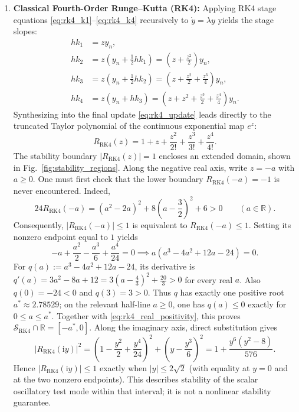 \documentclass[11pt,a4paper]{article}
\theoremstyle{definition}
\theoremstyle{remark}
\begin{document}
\begin{enumerate}
    \item \textbf{Classical Fourth-Order Runge--Kutta (RK4):} Applying RK4 stage equations \eqref{eq:rk4_k1}--\eqref{eq:rk4_k4} recursively to $\dot{y} = \lambda y$ yields the stage slopes:
    \begin{align}
    h k_1 &= z y_n, \label{eq:rk4_stg1} \\
    h k_2 &= z \left( y_n + \frac{1}{2} h k_1 \right) = \left( z + \frac{z^2}{2} \right) y_n, \label{eq:rk4_stg2} \\
    h k_3 &= z \left( y_n + \frac{1}{2} h k_2 \right) = \left( z + \frac{z^2}{2} + \frac{z^3}{4} \right) y_n, \label{eq:rk4_stg3} \\
    h k_4 &= z \left( y_n + h k_3 \right) = \left( z + z^2 + \frac{z^3}{2} + \frac{z^4}{4} \right) y_n. \label{eq:rk4_stg4}
    \end{align}
    Synthesizing into the final update \eqref{eq:rk4_update} leads directly to the truncated Taylor polynomial of the continuous exponential map $e^z$:
    \begin{equation}
    \label{eq:R_RK4}
    R_{\mathrm{RK4}}(z) = 1 + z + \frac{z^2}{2!} + \frac{z^3}{3!} + \frac{z^4}{4!}.
    \end{equation}
    The stability boundary $|R_{\mathrm{RK4}}(z)| = 1$ encloses an extended domain, shown in Fig.~\ref{fig:stability_regions}. Along the negative real axis, write $z=-a$ with $a\geq0$. One must first check that the lower boundary $R_{\mathrm{RK4}}(-a)=-1$ is never encountered. Indeed,
    \begin{equation}
    \label{eq:rk4_real_positivity}
    24R_{\mathrm{RK4}}(-a)
    =(a^2-2a)^2+8\left(a-\frac32\right)^2+6>0
    \qquad(a\in\mathbb R).
    \end{equation}
    Consequently, $|R_{\mathrm{RK4}}(-a)|\leq1$ is equivalent to $R_{\mathrm{RK4}}(-a)\leq1$. Setting its nonzero endpoint equal to $1$ yields
    \begin{equation}
    \label{eq:rk4_real_root}
    -a + \frac{a^2}{2} - \frac{a^3}{6} + \frac{a^4}{24} = 0 \implies a\left(a^3 - 4a^2 + 12a - 24\right) = 0.
    \end{equation}
    For $q(a):=a^3-4a^2+12a-24$, its derivative is $q'(a)=3a^2-8a+12=3(a-\tfrac43)^2+\tfrac{20}{3}>0$ for every real $a$. Also $q(0)=-24<0$ and $q(3)=3>0$. Thus $q$ has exactly one positive root $a^*\approx2.78529$; on the relevant half-line $a\geq0$, one has $q(a)\leq0$ exactly for $0\leq a\leq a^*$. Together with \eqref{eq:rk4_real_positivity}, this proves $\mathcal S_{\mathrm{RK4}}\cap\mathbb R=[-a^*,0]$. Along the imaginary axis, direct substitution gives
    \begin{equation}
    \label{eq:rk4_imaginary_axis_modulus}
    |R_{\mathrm{RK4}}(\mathrm i y)|^2
    =\left(1-\frac{y^2}{2}+\frac{y^4}{24}\right)^2
     +\left(y-\frac{y^3}{6}\right)^2
    =1+\frac{y^6(y^2-8)}{576}.
    \end{equation}
    Hence $|R_{\mathrm{RK4}}(\mathrm i y)|\leq1$ exactly when $|y|\leq2\sqrt2$ (with equality at $y=0$ and at the two nonzero endpoints). This describes stability of the scalar oscillatory test mode within that interval; it is not a nonlinear stability guarantee.


\end{enumerate}
\end{document}
